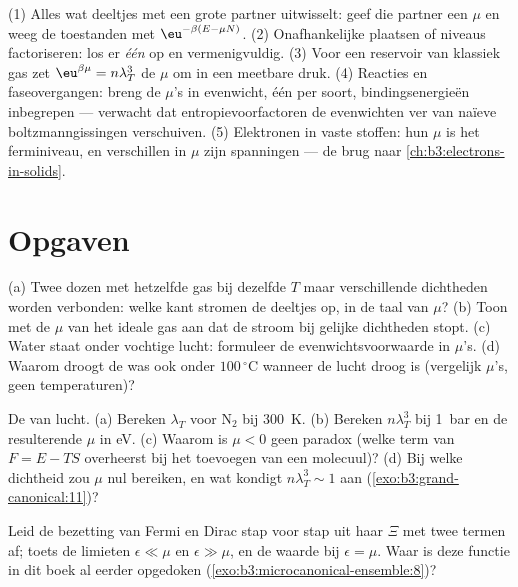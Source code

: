 \begin{method}\label{met:b3:grand-canonical:method}
(1) Alles wat deeltjes met een grote partner uitwisselt: geef die partner
een $\mu$ en weeg de toestanden met $\eu^{-\beta(E - \mu N)}$. (2)
Onafhankelijke plaatsen of niveaus factoriseren: los er \emph{één} op en
vermenigvuldig. (3) Voor een reservoir van klassiek gas zet
$\eu^{\beta\mu} =
n\lambda_T^3$ de $\mu$ om in een meetbare druk. (4)
Reacties en faseovergangen: breng de $\mu$'s in evenwicht, één per soort,
bindingsenergieën inbegrepen --- verwacht dat entropievoorfactoren de
evenwichten ver van naïeve boltzmanngissingen verschuiven. (5) Elektronen
in vaste stoffen: hun $\mu$ is het ferminiveau, en verschillen in $\mu$
zijn spanningen --- de brug naar
\cref{ch:b3:electrons-in-solids}.
\end{method}

\section{Opgaven}

\begin{exercise}[$\star$]\label{exo:b3:grand-canonical:1}
(a) Twee dozen met hetzelfde gas bij dezelfde $T$ maar verschillende
dichtheden worden verbonden: welke kant stromen de deeltjes op, in de taal
van $\mu$? (b) Toon met de $\mu$ van het ideale gas aan dat de stroom bij
gelijke dichtheden stopt. (c) Water staat onder vochtige lucht: formuleer
de evenwichtsvoorwaarde in $\mu$'s. (d) Waarom droogt de was ook onder
$100\,^\circ$C wanneer de lucht droog is (vergelijk $\mu$'s, geen
temperaturen)?
\end{exercise}

\begin{exercise}[$\star$]\label{exo:b3:grand-canonical:2}
De  van lucht. (a) Bereken $\lambda_T$ voor N$_2$ bij
\qty{300}{K}. (b) Bereken $n\lambda_T^3$ bij \qty{1}{bar} en de
resulterende $\mu$ in eV. (c) Waarom is $\mu < 0$ geen paradox (welke term
van $F = E - TS$ overheerst bij het toevoegen van een molecuul)? (d) Bij
welke dichtheid zou $\mu$ nul bereiken, en wat kondigt $n\lambda_T^3 \sim 1$ aan (\cref{exo:b3:grand-canonical:11})?
\end{exercise}

\begin{exercise}[$\star$]\label{exo:b3:grand-canonical:3}
Leid de bezetting van Fermi en Dirac stap voor stap uit haar $\Xi$ met
twee termen af; toets de limieten $\epsilon \ll \mu$ en $\epsilon \gg
\mu$, en de waarde bij $\epsilon = \mu$. Waar is deze functie in dit boek
al eerder opgedoken
(\cref{exo:b3:microcanonical-ensemble:8})?
\end{exercise}

